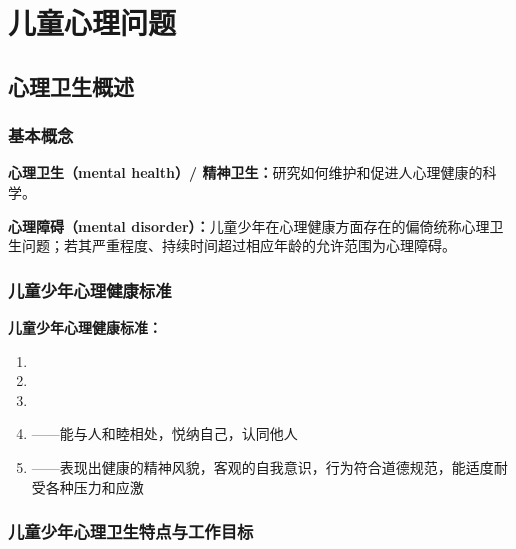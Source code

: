 \chapter{儿童心理问题}
\setcounter{chapter}{6}

\section{心理卫生概述}

\subsection{基本概念}

\begin{defbox}
\textbf{心理卫生（mental health）/ 精神卫生：}研究如何维护和促进人心理健康的科学。

\textbf{心理障碍（mental disorder）：}儿童少年在心理健康方面存在的偏倚统称心理卫生问题；若其严重程度、持续时间超过相应年龄的允许范围为心理障碍。
\end{defbox}

\subsection{儿童少年心理健康标准}

\begin{keybox}
\textbf{儿童少年心理健康标准：}

\begin{enumerate}[leftmargin=*]
    \item {}
    \item {}
    \item {}
    \item {}——能与人和睦相处，悦纳自己，认同他人
    \item {}——表现出健康的精神风貌，客观的自我意识，行为符合道德规范，能适度耐受各种压力和应激
\end{enumerate}
\end{keybox}

\subsection{儿童少年心理卫生特点与工作目标}

